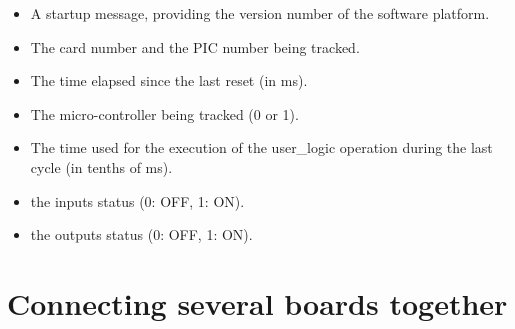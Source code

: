 \begin{itemize}
    \item A startup message, providing the version number of the software platform.
    \item The card number and the PIC number being tracked.
    \item The time elapsed since the last reset (in ms).
    \item The micro-controller being tracked (0 or 1).
    \item The time used for the execution of the user\_logic operation during the last cycle (in tenths of ms).
    \item the inputs status (0: OFF, 1: ON).
    \item the outputs status (0: OFF, 1: ON).
\end{itemize}

\chapter{Connecting several boards together}

